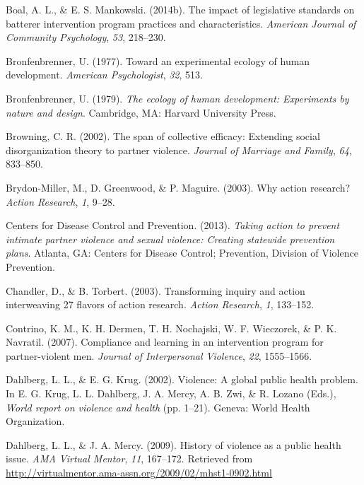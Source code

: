 \documentclass[11pt,]{tufte-book}
\begin{document}
\hypertarget{ref-boal2014impact}{}
Boal, A. L., \& E. S. Mankowski. (2014b). The impact of legislative
standards on batterer intervention program practices and
characteristics. \emph{American Journal of Community Psychology},
\emph{53}, 218--230.

\hypertarget{ref-bronfenbrenner1977toward}{}
Bronfenbrenner, U. (1977). Toward an experimental ecology of human
development. \emph{American Psychologist}, \emph{32}, 513.

\hypertarget{ref-bronfenbrenner1979ecology}{}
Bronfenbrenner, U. (1979). \emph{The ecology of human development:
Experiments by nature and design}. Cambridge, MA: Harvard University
Press.

\hypertarget{ref-browning2002span}{}
Browning, C. R. (2002). The span of collective efficacy: Extending
social disorganization theory to partner violence. \emph{Journal of
Marriage and Family}, \emph{64}, 833--850.

\hypertarget{ref-brydon-miller2003why}{}
Brydon-Miller, M., D. Greenwood, \& P. Maguire. (2003). Why action
research? \emph{Action Research}, \emph{1}, 9--28.

\hypertarget{ref-centers2013taking}{}
Centers for Disease Control and Prevention. (2013). \emph{Taking action
to prevent intimate partner violence and sexual violence: Creating
statewide prevention plans}. Atlanta, GA: Centers for Disease Control;
Prevention, Division of Violence Prevention.

\hypertarget{ref-chandler2003transforming}{}
Chandler, D., \& B. Torbert. (2003). Transforming inquiry and action
interweaving 27 flavors of action research. \emph{Action Research},
\emph{1}, 133--152.

\hypertarget{ref-contrino2007compliance}{}
Contrino, K. M., K. H. Dermen, T. H. Nochajski, W. F. Wieczorek, \& P.
K. Navratil. (2007). Compliance and learning in an intervention program
for partner-violent men. \emph{Journal of Interpersonal Violence},
\emph{22}, 1555--1566.

\hypertarget{ref-dahlberg2002violence}{}
Dahlberg, L. L., \& E. G. Krug. (2002). Violence: A global public health
problem. In E. G. Krug, L. L. Dahlberg, J. A. Mercy, A. B. Zwi, \& R.
Lozano (Eds.), \emph{World report on violence and health} (pp. 1--21).
Geneva: World Health Organization.

\hypertarget{ref-dahlberg2009history}{}
Dahlberg, L. L., \& J. A. Mercy. (2009). History of violence as a public
health issue. \emph{AMA Virtual Mentor}, \emph{11}, 167--172. Retrieved
from \url{http://virtualmentor.ama-assn.org/2009/02/mhst1-0902.html}
\end{document}
